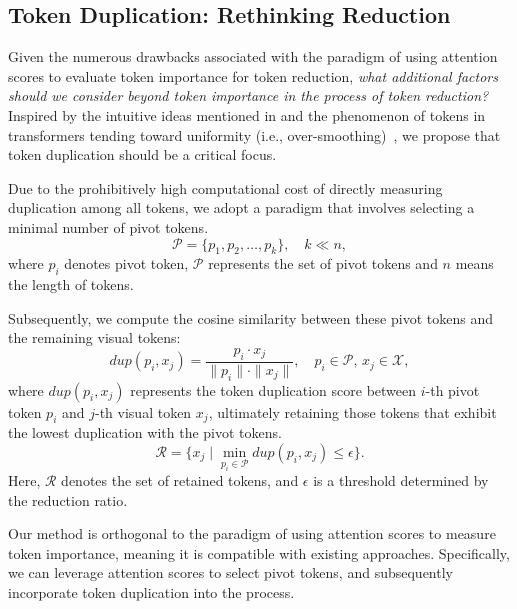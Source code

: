 \subsection{Token Duplication: Rethinking Reduction}
Given the numerous drawbacks associated with the paradigm of using attention scores to evaluate token importance for token reduction, \textit{what additional factors should we consider beyond token importance in the process of token reduction?}
Inspired by the intuitive ideas mentioned in  and the phenomenon of tokens in transformers tending toward uniformity (i.e., over-smoothing)~\citep{nguyen2023mitigating, gong2021vision}, we propose that token duplication should be a critical focus.

Due to the prohibitively high computational cost of directly measuring duplication among all tokens, we adopt a paradigm that involves selecting a minimal number of pivot tokens. 
\begin{equation}
    \mathcal{P} = \{p_1, p_2, \dots, p_k\}, \quad k \ll n,
\end{equation}
where $p_i$ denotes pivot token, $\mathcal{P}$ represents the set of pivot tokens and $n$ means the length of tokens.

Subsequently, we compute the cosine similarity between these pivot tokens and the remaining visual tokens:
\begin{equation}
    dup (p_i, x_j) = \frac{p_i \cdot x_j}{\|p_i\| \cdot \|x_j\|}, \quad p_i \in \mathcal{P}, \, x_j \in \mathcal{X},
\end{equation}
where $dup (p_i, x_j)$ represents the token duplication score between $i$-th pivot token $p_i$ and $j$-th visual token $x_j$,
ultimately retaining those tokens that exhibit the lowest duplication with the pivot tokens.
\begin{equation}
    \mathcal{R} = \{ x_j \mid \min_{p_i \in \mathcal{P}} dup (p_i, x_j) \leq \epsilon \}.
\end{equation}
Here, $\mathcal{R}$ denotes the set of retained tokens, and $\epsilon$ is a threshold determined by the reduction ratio.

Our method is orthogonal to the paradigm of using attention scores to measure token importance, meaning it is compatible with existing approaches. Specifically, we can leverage attention scores to select pivot tokens, and subsequently incorporate token duplication into the process.

